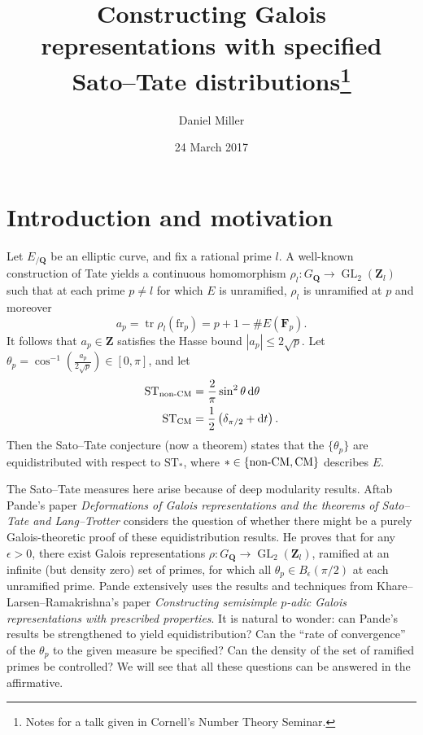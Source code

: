 \documentclass{article}
\title{Constructing Galois representations with specified Sato--Tate 
distributions\thanks{Notes for a talk given in Cornell's Number Theory 
Seminar.}}
\author{Daniel Miller}
\date{24 March 2017}
\DeclareMathOperator{\GL}{GL}
\DeclareMathOperator{\tr}{tr}
\newcommand{\bF}{\mathbf{F}}
\newcommand{\bQ}{\mathbf{Q}}
\newcommand{\bZ}{\mathbf{Z}}
\newcommand{\CM}{\mathrm{CM}}
\newcommand{\dd}{\mathrm{d}}
\newcommand{\frob}{\mathrm{fr}}
\newcommand{\nonCM}{\textnormal{non-CM}}
\newcommand{\ST}{\mathrm{ST}}
\begin{document}
\maketitle





\section{Introduction and motivation}

Let $E_{/\bQ}$ be an elliptic curve, and fix a rational prime $l$. A well-known 
construction of Tate yields a continuous homomorphism 
$\rho_l\colon G_\bQ \to \GL_2(\bZ_l)$ such that at each prime $p\ne l$ for 
which $E$ is unramified, $\rho_l$ is unramified at $p$ and moreover 
\[
	a_p = \tr\rho_l (\frob_p) = p + 1 - \# E(\bF_p) .
\]
It follows that $a_p\in \bZ$ satisfies the Hasse bound 
$|a_p| \leqslant 2\sqrt p$. Let 
$\theta_p = \cos^{-1}\left( \frac{a_p}{2\sqrt p}\right) \in [0,\pi]$, and let 
\begin{align*}
	\ST_\nonCM &= \frac{2}{\pi} \sin^2\theta\, \dd\theta \\
	\ST_\CM &= \frac 1 2 \left( \delta_{\pi/2} + \dd t\right) .
\end{align*}
Then the Sato--Tate conjecture (now a theorem) states that the $\{\theta_p\}$ 
are equidistributed with respect to $\ST_\ast$, where $\ast\in \{\nonCM,\CM\}$ 
describes $E$. 

The Sato--Tate measures here arise because of deep modularity results. Aftab 
Pande's paper \emph{Deformations of Galois representations and the theorems of 
Sato--Tate and Lang--Trotter} considers the question of whether there might be 
a purely Galois-theoretic proof of these equidistribution results. He proves 
that for any $\epsilon>0$, there exist Galois representations 
$\rho\colon G_\bQ \to \GL_2(\bZ_l)$, ramified at an infinite (but density zero) 
set of primes, for which all $\theta_p\in B_\epsilon(\pi/2)$ at each unramified 
prime. Pande extensively uses the results and techniques from 
Khare--Larsen--Ramakrishna's paper \emph{Constructing semisimple $p$-adic 
Galois representations with prescribed properties}. It is natural to wonder: 
can Pande's results be strengthened to yield equidistribution? Can the ``rate 
of convergence'' of the $\theta_p$ to the given measure be specified? Can the 
density of the set of ramified primes be controlled? We will see that all these 
questions can be answered in the affirmative. 
\end{document}
